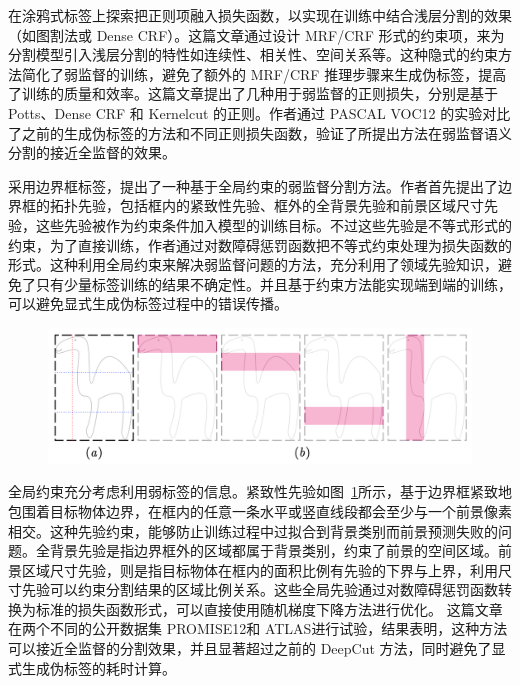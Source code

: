 \citet{tang2018regularized}在涂鸦式标签上探索把正则项融入损失函数，以实现在训练中结合浅层分割的效果（如图割法或 Dense CRF）。这篇文章通过设计 MRF/CRF 形式的约束项，来为分割模型引入浅层分割的特性如连续性、相关性、空间关系等。这种隐式的约束方法简化了弱监督的训练，避免了额外的 MRF/CRF 推理步骤来生成伪标签，提高了训练的质量和效率。这篇文章提出了几种用于弱监督的正则损失，分别是基于 Potts、Dense CRF 和 Kernelcut 的正则。作者通过 PASCAL VOC12\citep{everingham2015pascal} 的实验对比了之前的生成伪标签的方法和不同正则损失函数，验证了所提出方法在弱监督语义分割的接近全监督的效果。

\citet{kervadec2020bounding} 采用边界框标签，提出了一种基于全局约束的弱监督分割方法。作者首先提出了边界框的拓扑先验，包括框内的紧致性先验、框外的全背景先验和前景区域尺寸先验，这些先验被作为约束条件加入模型的训练目标。不过这些先验是不等式形式的约束，为了直接训练，作者通过对数障碍惩罚函数把不等式约束处理为损失函数的形式。这种利用全局约束来解决弱监督问题的方法，充分利用了领域先验知识，避免了只有少量标签训练的结果不确定性。并且基于约束方法能实现端到端的训练，可以避免显式生成伪标签过程中的错误传播。
    \begin{figure}[tbp]
        \centering 
        \includegraphics[width=1.0\textwidth]{img/c2/rel_a6.png}
        \label{c2_fig6}
    \end{figure}
全局约束充分考虑利用弱标签的信息。紧致性先验如图~\ref{c2_fig6}所示，基于边界框紧致地包围着目标物体边界，在框内的任意一条水平或竖直线段都会至少与一个前景像素相交。这种先验约束，能够防止训练过程中过拟合到背景类别而前景预测失败的问题。全背景先验是指边界框外的区域都属于背景类别，约束了前景的空间区域。前景区域尺寸先验，则是指目标物体在框内的面积比例有先验的下界与上界，利用尺寸先验可以约束分割结果的区域比例关系。这些全局先验通过对数障碍惩罚函数转换为标准的损失函数形式，可以直接使用随机梯度下降方法进行优化。
这篇文章在两个不同的公开数据集 PROMISE12\citep{Litjens2014EvaluationOP}和 ATLAS\citep{Liew2018ALO}进行试验，结果表明，这种方法可以接近全监督的分割效果，并且显著超过之前的 DeepCut 方法，同时避免了显式生成伪标签的耗时计算。


